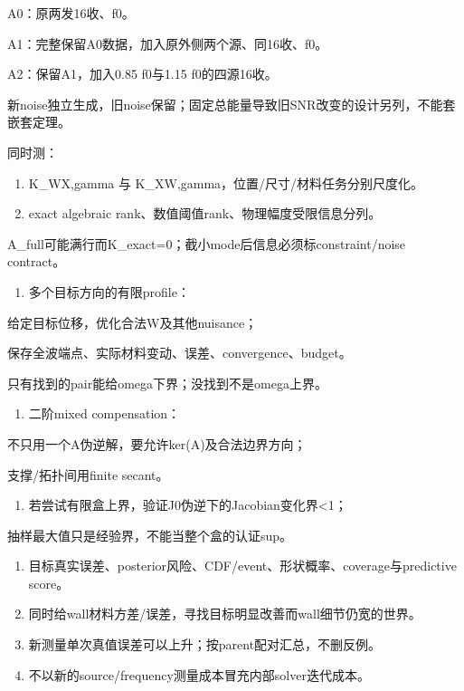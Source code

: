 \documentclass[
  10pt,
  a4paper,
]{article}
\providecommand{\tightlist}{%
  \setlength{\itemsep}{0pt}\setlength{\parskip}{0pt}}
\providecommand{\tightlist}{\setlength{\itemsep}{1pt}\setlength{\parskip}{1pt}}
\begin{document}
A0：原两发16收、f0。

A1：完整保留A0数据，加入原外侧两个源、同16收、f0。

A2：保留A1，加入0.85 f0与1.15 f0的四源16收。

新noise独立生成，旧noise保留；固定总能量导致旧SNR改变的设计另列，不能套嵌套定理。

同时测：

\begin{enumerate}
\def\labelenumi{\arabic{enumi}.}
\item
  K\_W\textbar X,gamma 与
  K\_X\textbar W,gamma，位置/尺寸/材料任务分别尺度化。
\item
  exact algebraic rank、数值阈值rank、物理幅度受限信息分列。
\end{enumerate}

A\_full可能满行而K\_exact=0；截小mode后信息必须标constraint/noise
contract。

\begin{enumerate}
\def\labelenumi{\arabic{enumi}.}
\setcounter{enumi}{2}
\tightlist
\item
  多个目标方向的有限profile：
\end{enumerate}

给定目标位移，优化合法W及其他nuisance；

保存全波端点、实际材料变动、误差、convergence、budget。

只有找到的pair能给omega下界；没找到不是omega上界。

\begin{enumerate}
\def\labelenumi{\arabic{enumi}.}
\setcounter{enumi}{3}
\tightlist
\item
  二阶mixed compensation：
\end{enumerate}

不只用一个A伪逆解，要允许ker(A)及合法边界方向；

支撑/拓扑间用finite secant。

\begin{enumerate}
\def\labelenumi{\arabic{enumi}.}
\setcounter{enumi}{4}
\tightlist
\item
  若尝试有限盒上界，验证J0伪逆下的Jacobian变化界\textless1；
\end{enumerate}

抽样最大值只是经验界，不能当整个盒的认证sup。

\begin{enumerate}
\def\labelenumi{\arabic{enumi}.}
\setcounter{enumi}{5}
\item
  目标真实误差、posterior风险、CDF/event、形状概率、coverage与predictive
  score。
\item
  同时给wall材料方差/误差，寻找目标明显改善而wall细节仍宽的世界。
\item
  新测量单次真值误差可以上升；按parent配对汇总，不删反例。
\item
  不以新的source/frequency测量成本冒充内部solver迭代成本。
\end{enumerate}
\end{document}
